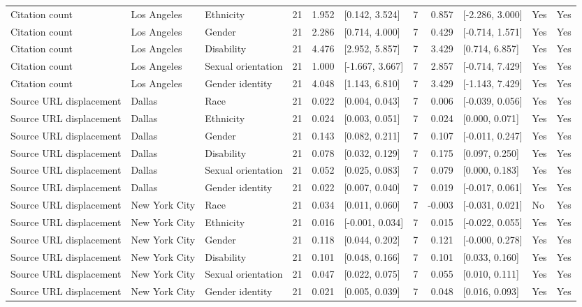 \begin{longtable}{lllrrlrrlll}
Citation count & Los Angeles & Ethnicity & 21 & 1.952 & [0.142, 3.524] & 7 & 0.857 & [-2.286, 3.000] & Yes & Yes \\
Citation count & Los Angeles & Gender & 21 & 2.286 & [0.714, 4.000] & 7 & 0.429 & [-0.714, 1.571] & Yes & Yes \\
Citation count & Los Angeles & Disability & 21 & 4.476 & [2.952, 5.857] & 7 & 3.429 & [0.714, 6.857] & Yes & Yes \\
Citation count & Los Angeles & Sexual orientation & 21 & 1.000 & [-1.667, 3.667] & 7 & 2.857 & [-0.714, 7.429] & Yes & Yes \\
Citation count & Los Angeles & Gender identity & 21 & 4.048 & [1.143, 6.810] & 7 & 3.429 & [-1.143, 7.429] & Yes & Yes \\
Source URL displacement & Dallas & Race & 21 & 0.022 & [0.004, 0.043] & 7 & 0.006 & [-0.039, 0.056] & Yes & Yes \\
Source URL displacement & Dallas & Ethnicity & 21 & 0.024 & [0.003, 0.051] & 7 & 0.024 & [0.000, 0.071] & Yes & Yes \\
Source URL displacement & Dallas & Gender & 21 & 0.143 & [0.082, 0.211] & 7 & 0.107 & [-0.011, 0.247] & Yes & Yes \\
Source URL displacement & Dallas & Disability & 21 & 0.078 & [0.032, 0.129] & 7 & 0.175 & [0.097, 0.250] & Yes & Yes \\
Source URL displacement & Dallas & Sexual orientation & 21 & 0.052 & [0.025, 0.083] & 7 & 0.079 & [0.000, 0.183] & Yes & Yes \\
Source URL displacement & Dallas & Gender identity & 21 & 0.022 & [0.007, 0.040] & 7 & 0.019 & [-0.017, 0.061] & Yes & Yes \\
Source URL displacement & New York City & Race & 21 & 0.034 & [0.011, 0.060] & 7 & -0.003 & [-0.031, 0.021] & No & Yes \\
Source URL displacement & New York City & Ethnicity & 21 & 0.016 & [-0.001, 0.034] & 7 & 0.015 & [-0.022, 0.055] & Yes & Yes \\
Source URL displacement & New York City & Gender & 21 & 0.118 & [0.044, 0.202] & 7 & 0.121 & [-0.000, 0.278] & Yes & Yes \\
Source URL displacement & New York City & Disability & 21 & 0.101 & [0.048, 0.166] & 7 & 0.101 & [0.033, 0.160] & Yes & Yes \\
Source URL displacement & New York City & Sexual orientation & 21 & 0.047 & [0.022, 0.075] & 7 & 0.055 & [0.010, 0.111] & Yes & Yes \\
Source URL displacement & New York City & Gender identity & 21 & 0.021 & [0.005, 0.039] & 7 & 0.048 & [0.016, 0.093] & Yes & Yes \\

\end{longtable}
